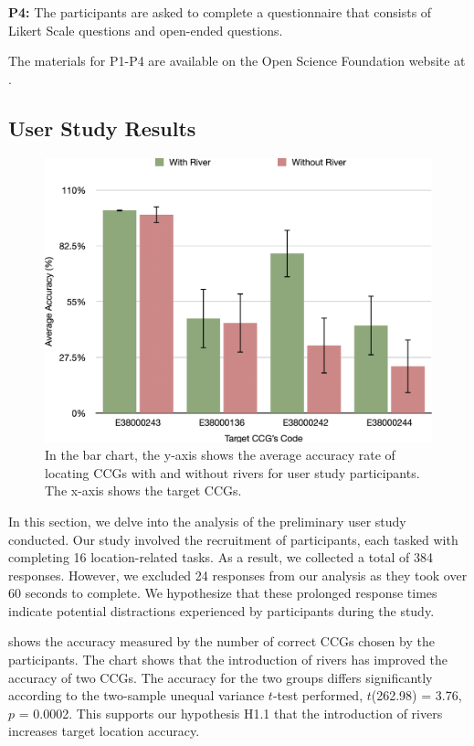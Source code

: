 \textbf{P4:} The participants are asked to complete a questionnaire that consists of Likert Scale questions and open-ended questions.

The materials for P1-P4 are available on the Open Science Foundation website at .

\subsection{User Study Results}

{
    \begin{figure}[b!]
        \centering
        \includegraphics[width=\columnwidth,keepaspectratio]{figure/evaluation/accuracy.png}
        \caption{In the bar chart, the y-axis shows the average accuracy rate of locating CCGs with and without rivers for user study participants. The x-axis shows the target CCGs.}
        \label{fig:task-acc}
    \end{figure}
}


In this section, we delve into the analysis of the preliminary user study conducted. Our study involved the recruitment of \pCount participants, each tasked with completing 16 location-related tasks. As a result, we collected a total of 384 responses. However, we excluded 24 responses from our analysis as they took over 60 seconds to complete. We hypothesize that these prolonged response times indicate potential distractions experienced by participants during the study.

  shows the accuracy measured by the number of correct CCGs chosen by the participants. The chart shows that the introduction of rivers has improved the accuracy of two CCGs. The accuracy for the two groups differs significantly according to the two-sample unequal variance $t$-test performed, $t$(262.98) = 3.76, $p$ = 0.0002. This supports our hypothesis H1.1 that the introduction of rivers increases target location accuracy.


